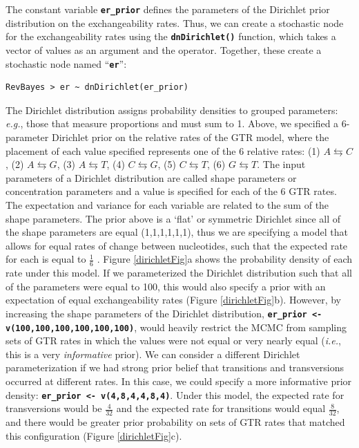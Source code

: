 \documentclass[11pt]{article}
\newcommand{\cl}[1]{{\texttt{\textbf{#1}}}}
\newcommand{\rbdn}{{\Large \symbol{126}}} %
\begin{document}
The constant variable \cl{er\_prior} defines the parameters of the Dirichlet prior distribution on the exchangeability rates. Thus, we can create a stochastic node for the exchangeability rates using the \cl{dnDirichlet()} function, which takes a vector of values as an argument and the \cl{\rbdn} operator. Together, these create a stochastic node named ``\cl{er}'': 

{\tt \begin{snugshade*}
\begin{lstlisting}
RevBayes > er ~ dnDirichlet(er_prior)
\end{lstlisting}
\end{snugshade*}}

The Dirichlet distribution assigns probability densities to grouped parameters: {\it e.g.}, those that measure proportions and must sum to 1. 
Above, we specified a 6-parameter Dirichlet prior on the relative rates of the GTR model, where the placement of each value specified represents one of the 6 relative rates: (1) $A\leftrightarrows C$, (2) $A\leftrightarrows G$, (3) $A\leftrightarrows T$, (4) $C\leftrightarrows G$, (5) $C\leftrightarrows T$, (6) $G\leftrightarrows T$. 
The input parameters of a Dirichlet distribution are called shape parameters or concentration parameters and a value is specified for each of the 6 GTR rates. 
The expectation and variance for each variable are related to the sum of the shape parameters.
The prior above is a `flat' or symmetric Dirichlet since all of the shape parameters are equal (1,1,1,1,1,1), thus we are specifying a model that allows for equal rates of change between nucleotides, such that the expected rate for each is equal to $\frac{1}{6}$ \citep{zwickl04}.
Figure \ref{dirichletFig}a shows the probability density of each rate under this model.
If we parameterized the Dirichlet distribution such that all of the parameters were equal to 100, this would also specify a prior with an expectation of equal exchangeability rates (Figure \ref{dirichletFig}b). 
However, by increasing the shape parameters of the Dirichlet distribution, \cl{er\_prior <- v(100,100,100,100,100,100)}, would heavily restrict the MCMC from sampling sets of GTR rates in which the values were not equal or very nearly equal ({\it i.e.}, this is a very {\em informative} prior). 
We can consider a different Dirichlet parameterization if we had strong prior belief that transitions and transversions occurred at different rates.
In this case, we could specify a more informative prior density: \cl{er\_prior <- v(4,8,4,4,8,4)}. 
Under this model, the expected rate for transversions would be $\frac{4}{32}$ and the expected rate for transitions would equal $\frac{8}{32}$, and there would be greater prior probability on sets of GTR rates that matched this configuration (Figure \ref{dirichletFig}c). 
\end{document}
